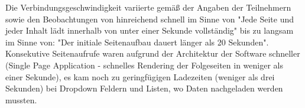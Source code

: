 Die Verbindungsgeschwindigkeit variierte gemäß der Angaben der Teilnehmern sowie den Beobachtungen von hinreichend schnell im Sinne von "Jede Seite und jeder Inhalt lädt innerhalb von unter einer Sekunde vollständig" bis zu langsam im Sinne von: "Der initiale Seitenaufbau dauert länger als 20 Sekunden". Konsekutive Seitenaufrufe waren aufgrund der Architektur der Software schneller (Single Page Application - schnelles Rendering der Folgeseiten in weniger als einer Sekunde), es kam noch zu geringfügigen Ladezeiten (weniger als drei Sekunden) bei Dropdown Feldern und Listen, wo Daten nachgeladen werden mussten.
